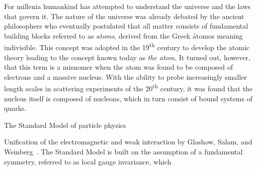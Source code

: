 %
%
%
%
%






For millenia humankind has attempted to understand the universe and the laws
that govern it. The nature of the universe was already debated by the ancient
philosophers who eventually postulated that all matter consists of fundamental
building blocks referred to as \emph{atoms}, derived from the Greek átomos
meaning indivisible. This concept was adopted in the 19\textsuperscript{th}
century to develop the atomic theory leading to the concept known today as
\emph{the atom}. It turned out, however, that this term is a misnomer when the
atom was found to be composed of electrons and a massive nucleus. With the
ability to probe increasingly smaller length scales in scattering experiments of
the 20\textsuperscript{th} century, it was found that the nucleus itself is
composed of nucleons, which in turn consist of bound systems of quarks.

The Standard Model of particle physics

Unification of the electromagnetic and weak interaction by Glashow, Salam, and
Weinberg~\cite{Glashow:1961tr,Salam:1964ry,Weinberg:1967tq}. The Standard Model
is built on the assumption of a fundamental symmetry, referred to as local gauge
invariance, which

